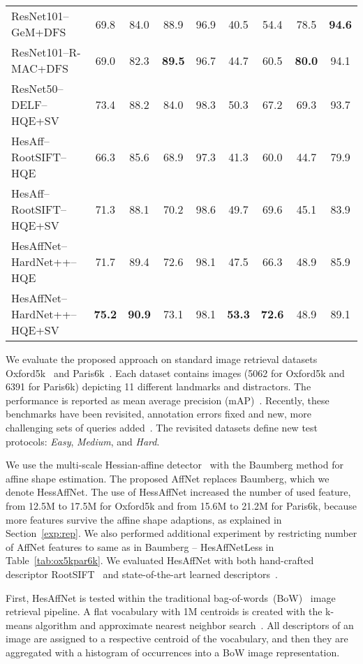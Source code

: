 \documentclass[runningheads]{llncs}
\begin{document}
\begin{table*}[tb]
{\begin{tabular}{lcccccccc}
ResNet101--GeM\cite{Radenovic-arXiv17}+DFS~\cite{Iscen2017CVPR} & 69.8 & 84.0 & 88.9 & 96.9 & 40.5 & 54.4 & 78.5 & \textbf{94.6} \\
ResNet101--R-MAC\cite{Gordo-IJCV17}+DFS~\cite{Iscen2017CVPR} & 69.0 & 82.3 & \textbf{89.5} & 96.7 & 44.7 & 60.5 & \textbf{80.0} & 94.1 \\
ResNet50--DELF\cite{DELF2017}--HQE+SV & 73.4 & 88.2 & 84.0 & 98.3 & 50.3 & 67.2 & 69.3 & 93.7 \\
\cmidrule(r){1-9}
HesAff--RootSIFT--HQE~\cite{Tolias-PR2014HQE} & 66.3 & 85.6 & 68.9 & 97.3 & 41.3 & 60.0 & 44.7 & 79.9 \\
HesAff--RootSIFT--HQE+SV~\cite{Tolias-PR2014HQE} & 71.3 & 88.1 & 70.2 & 98.6 & 49.7 & 69.6 & 45.1 & 83.9 \\
\cmidrule(r){1-9}
HesAffNet--HardNet++--HQE & 71.7 & 89.4 & 72.6 & 98.1 & 47.5 & 66.3 & 48.9 & 85.9 \\
HesAffNet--HardNet++--HQE+SV & \textbf{75.2} & \textbf{90.9} & 73.1 & 98.1 & \textbf{53.3} &
\textbf{72.6} & 48.9 & 89.1 \\
\bottomrule
\end{tabular}
}
\end{table*}We evaluate the proposed approach on standard image retrieval datasets Oxford5k~\cite{Philbin07} and Paris6k~\cite{Philbin08}.
Each dataset contains images (5062 for Oxford5k and 6391 for Paris6k) depicting 11 different landmarks and distractors. The performance is reported as mean average precision (mAP)~\cite{Philbin07}.
Recently, these benchmarks have been revisited, annotation errors fixed and new, more challenging sets of queries added~\cite{revisitop}. The revisited datasets define new test protocols: \textit{Easy}, \textit{Medium}, and \textit{Hard}.

We use the multi-scale Hessian-affine detector~\cite{Mikolajczyk2005} with the Baumberg method for affine shape estimation. The proposed AffNet replaces Baumberg, which we denote HessAffNet. The use of HessAffNet increased the number of used feature, from 12.5M to 17.5M for Oxford5k and from 15.6M to 21.2M for Paris6k, because more features survive the affine shape adaptions, as explained in Section~\ref{exp:rep}. We also performed additional experiment by restricting number of AffNet features to same as in Baumberg -- HesAffNetLess in Table~\ref{tab:ox5kpar6k}. We evaluated HesAffNet with both hand-crafted descriptor RootSIFT~\cite{RootSIFT2012} and state-of-the-art learned descriptors~\cite{TFeat2016,HardNet2017}.

First, HesAffNet is tested within the traditional bag-of-words~(BoW)~\cite{Sivic-ICCV2003VideoGoogle} image retrieval pipeline. A flat vocabulary with 1M centroids is created with the k-means algorithm and approximate nearest neighbor search~\cite{flann2009}. All descriptors of an image are assigned to a respective centroid of the vocabulary, and then they are aggregated with a histogram of occurrences into a BoW image representation.
\end{document}
